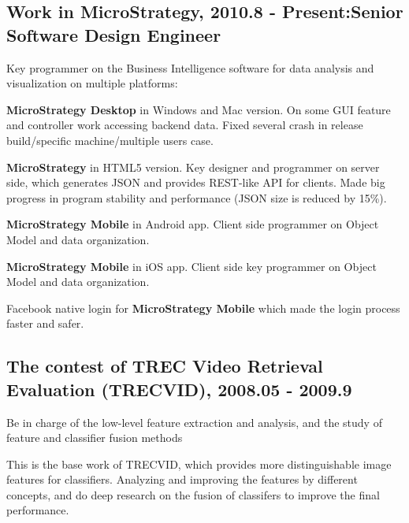 \documentclass[letterpaper]{article}
\renewenvironment{itemize}{
  \begin{list}{}{
    \setlength{\leftmargin}{1.5em}
    \setlength{\itemsep}{0pt}
  }
}{
  \end{list}
}
\begin{document}
\subsection*{Work in MicroStrategy, 2010.8 - Present:\hfill Senior Software Design Engineer}
\begin{itemize}
\item Key programmer on the Business Intelligence software for data analysis and visualization on multiple platforms:
\item \textbf{MicroStrategy Desktop} in Windows and Mac version. On some GUI feature and controller work accessing backend data. Fixed several crash in release build/specific machine/multiple users case.
\item \textbf{MicroStrategy} in HTML5 version. Key designer and programmer on server side, which generates JSON and provides REST-like API for clients. Made big progress in program stability and performance (JSON size is reduced by 15\%).
\item \textbf{MicroStrategy Mobile} in Android app. Client side programmer on Object Model and data organization.
\item \textbf{MicroStrategy Mobile} in iOS app. Client side key programmer on Object Model and data organization.
\item Facebook native login for \textbf{MicroStrategy Mobile} which made the login process faster and safer.
\end{itemize}
\subsection*{The contest of TREC Video Retrieval Evaluation (TRECVID), 2008.05 - 2009.9}
\begin{itemize}
\item Be in charge of the low-level feature extraction and analysis, and the study of feature and classifier fusion methods
\item This is the base work of TRECVID, which provides more distinguishable image features for classifiers. Analyzing and improving the features by different concepts, and do deep research on the fusion of classifers to improve the final performance. 
\end{itemize}
\end{document}
